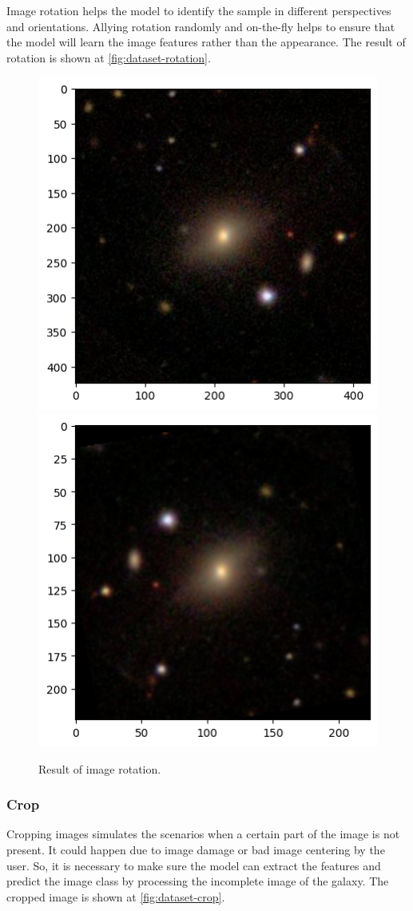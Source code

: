 Image rotation helps the model to identify the sample in different perspectives and orientations. Allying rotation randomly and on-the-fly helps to ensure that the model will learn the image features rather than the appearance. The result of rotation is shown at \autoref{fig:dataset-rotation}.

\begin{figure}[htbp]\centering
  \centering
  \includegraphics[width=0.5\linewidth]{obrazky-figures/03-dataset/orig.png}\hfill
  \includegraphics[width=0.5\linewidth]{obrazky-figures/03-dataset/rotation.png}
  \caption{Result of image rotation.}
  \label{fig:dataset-rotation}
\end{figure}

\subsubsection*{Crop}

Cropping images simulates the scenarios when a certain part of the image is not present. It could happen due to image damage or bad image centering by the user. So, it is necessary to make sure the model can extract the features and predict the image class by processing the incomplete image of the galaxy. The cropped image is shown at \autoref{fig:dataset-crop}.

